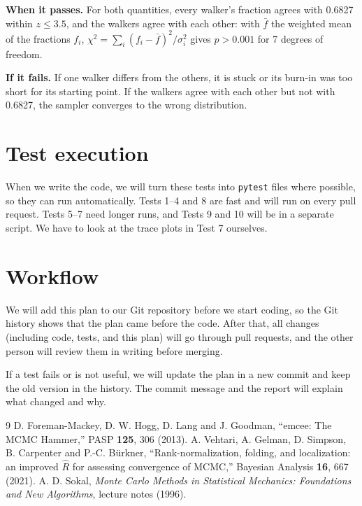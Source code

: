 \documentclass[11pt]{article}
\begin{document}
\textbf{When it passes.} For both quantities, every walker's fraction agrees
with 0.6827 within $z\le3.5$, and the walkers agree with each other: with
$\bar f$ the weighted mean of the fractions $f_i$,
$\chi^2=\sum_i (f_i-\bar f)^2/\sigma_i^2$ gives $p>0.001$ for 7 degrees of
freedom.

\textbf{If it fails.} If one walker differs from the others, it is stuck or its
burn-in was too short for its starting point. If the walkers agree with each
other but not with 0.6827, the sampler converges to the wrong distribution.


\section{Test execution}
When we write the code, we will turn these tests into \texttt{pytest} files where possible, so they can run automatically. Tests 1--4 and 8 are fast and will run on every pull request. Tests 5--7 need longer runs, and Tests 9 and 10 will be in a separate script. We have to look at the trace plots in Test 7 ourselves.



\section{Workflow}
We will add this plan to our Git repository before we start coding, so the Git history shows that the plan came before the code. After that, all changes (including code, tests, and this plan) will go through pull requests, and the other person will review them in writing before merging.

If a test fails or is not useful, we will update the plan in a new commit and keep the old version in the history. The commit message and the report will explain what changed and why. 


\begin{thebibliography}{9}
 D. Foreman-Mackey, D. W. Hogg, D. Lang and J. Goodman, ``emcee: The MCMC Hammer,'' PASP \textbf{125}, 306 (2013).
 A. Vehtari, A. Gelman, D. Simpson, B. Carpenter and P.-C. B\"urkner, ``Rank-normalization, folding, and localization: an improved $\hat R$ for assessing convergence of MCMC,'' Bayesian Analysis \textbf{16}, 667 (2021).
 A. D. Sokal, \emph{Monte Carlo Methods in Statistical Mechanics: Foundations and New Algorithms}, lecture notes (1996).
\end{thebibliography}
\end{document}
